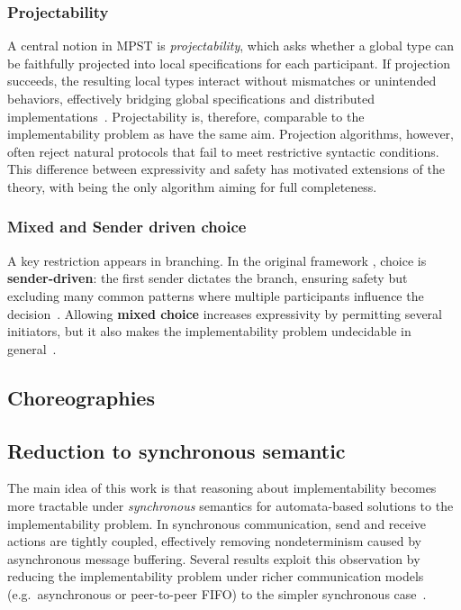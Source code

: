 
\subsubsection{Projectability}
A central notion in MPST is \emph{projectability}, which asks whether 
a global type can be faithfully projected into local specifications for 
each participant. If projection succeeds, the resulting local types 
interact without mismatches or unintended behaviors, effectively 
bridging global specifications and distributed implementations~\cite{honda2008multiparty}.  
Projectability is, therefore, comparable to the implementability
problem as have the same aim.
Projection algorithms, however, often reject natural protocols that 
fail to meet restrictive syntactic conditions. This difference between 
expressivity and safety has motivated extensions of the theory, with 
\cite{castagna2012global} being the only algorithm aiming for full 
completeness.

\subsubsection{Mixed and Sender driven choice}
A key restriction appears in branching. In the original framework \cite{honda2008multiparty,carbone2012structured}, 
choice is \textbf{sender-driven}: the first sender dictates the branch, 
ensuring safety but excluding many common patterns where multiple 
participants influence the decision~\cite{carbone2012structured}.  
Allowing \textbf{mixed choice} increases expressivity by permitting 
several initiators, but it also makes the implementability problem 
undecidable in general~\cite{barbanera2020choreography}.  

\subsection{Choreographies}


\subsection{Reduction to synchronous semantic}
The main idea of this work is that reasoning about implementability 
becomes more tractable under \emph{synchronous} 
semantics for automata-based solutions to the implementability problem. 
In synchronous communication, send and receive actions 
are tightly coupled, effectively removing nondeterminism 
caused by asynchronous message buffering. Several results exploit this 
observation by reducing the implementability problem under richer 
communication models (e.g.\ asynchronous or peer-to-peer FIFO) to the 
simpler synchronous case~\cite{alur2005realizability,di2023partial}.


